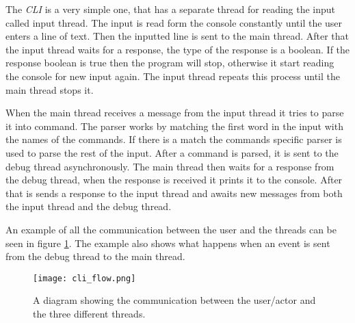 The \emph{CLI} is a very simple one, that has a separate thread for reading the input called input thread.
The input is read form the console constantly until the user enters a line of text.
Then the inputted line is sent to the main thread.
After that the input thread waits for a response, the type of the response is a boolean.
If the response boolean is true then the program will stop, otherwise it start reading the console for new input again.
The input thread repeats this process until the main thread stops it.


When the main thread receives a message from the input thread it tries to parse it into command.
The parser works by matching the first word in the input with the names of the commands.
If there is a match the commands specific parser is used to parse the rest of the input.
After a command is parsed, it is sent to the debug thread asynchronously.
The main thread then waits for a response from the debug thread, when the response is received it prints it to the console.
After that is sends a response to the input thread and awaits new messages from both the input thread and the debug thread.


An example of all the communication between the user and the threads can be seen in figure \ref{fig:cliflow}.
The example also shows what happens when an event is sent from the debug thread to the main thread.


\begin{figure}[h]
	\centering
	\texttt{[image: cli\_flow.png]}
	\caption{A diagram showing the communication between the user/actor and the three different threads.}
	\label{fig:cliflow}
\end{figure}

